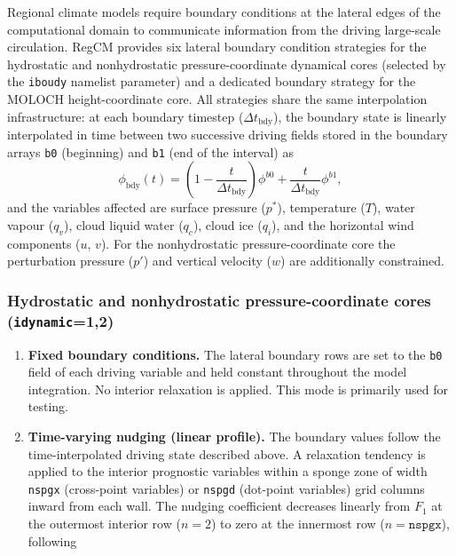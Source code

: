 {Regional climate models require boundary conditions at the lateral edges of
the computational domain to communicate information from the driving
large-scale circulation. RegCM provides six lateral boundary condition
strategies for the hydrostatic and nonhydrostatic pressure-coordinate
dynamical cores (selected by the \texttt{iboudy} namelist parameter) and
a dedicated boundary strategy for the MOLOCH height-coordinate core.
All strategies share the same interpolation infrastructure: at each boundary
timestep ($\Delta t_\mathrm{bdy}$), the boundary state is linearly interpolated
in time between two successive driving fields stored in the boundary arrays
\texttt{b0} (beginning) and \texttt{b1} (end of the interval) as
\begin{equation}
  \phi_\mathrm{bdy}(t) = \left(1 - \frac{t}{\Delta t_\mathrm{bdy}}\right)
  \phi^{b0} + \frac{t}{\Delta t_\mathrm{bdy}} \phi^{b1},
\end{equation}
and the variables affected are surface pressure ($p^*$), temperature ($T$),
water vapour ($q_v$), cloud liquid water ($q_c$), cloud ice ($q_i$), and
the horizontal wind components ($u$, $v$). For the nonhydrostatic
pressure-coordinate core the perturbation pressure ($p'$) and vertical
velocity ($w$) are additionally constrained.

\subsubsection{Hydrostatic and nonhydrostatic pressure-coordinate cores
(\texttt{idynamic}=1,2)}

\begin{enumerate}

\item[\texttt{iboudy=0}] \textbf{Fixed boundary conditions.}
The lateral boundary rows are set to the \texttt{b0} field of each
driving variable and held constant throughout the model integration.
No interior relaxation is applied. This mode is primarily used for testing.

\item[\texttt{iboudy=1}] \textbf{Time-varying nudging (linear profile).}
The boundary values follow the time-interpolated driving state described
above. A relaxation tendency is applied to the interior prognostic variables
within a sponge zone of width \texttt{nspgx} (cross-point variables) or
\texttt{nspgd} (dot-point variables) grid columns inward from each wall.
The nudging coefficient decreases linearly from $F_1$ at the outermost
interior row ($n=2$) to zero at the innermost row ($n = \texttt{nspgx}$),
following \citet{Giorgi_93}


\end{enumerate}}
